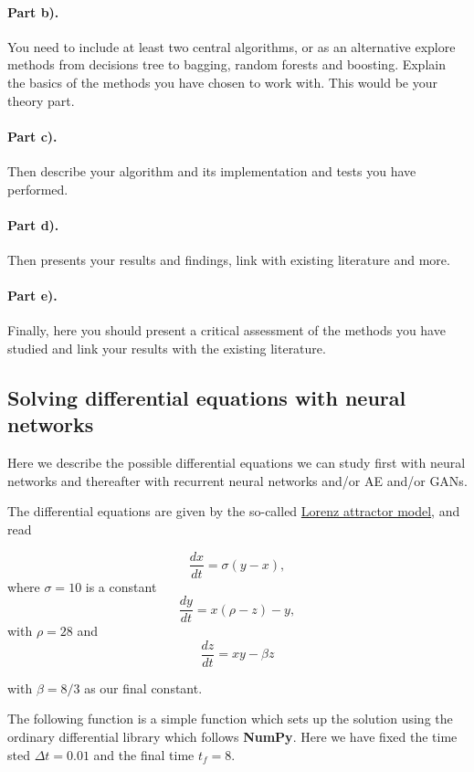 \documentclass[%
oneside,                 %
final,                   %
10pt]{article}
\begin{document}
\paragraph{Part b).}
You need to include at least two central algorithms, or as an alternative explore methods from decisions tree to bagging, random forests and boosting. Explain the basics of the methods you have chosen to work with. This would be your theory part.

\paragraph{Part c).}
Then describe your algorithm and its implementation and tests you have performed.

\paragraph{Part d).}
Then presents your results and findings, link with existing literature and more.

\paragraph{Part e).}
Finally, here you should present a critical assessment of the methods you have studied and link your results with the existing literature. 

\subsection{Solving  differential equations with neural networks}

Here we describe the possible differential equations we can study
first with neural networks and thereafter with recurrent neural
networks and/or AE and/or GANs.

The differential equations are given by the so-called \href{{https://encyclopediaofmath.org/index.php?title=Lorenz_attractor}}{Lorenz attractor model}, and read

\[
\frac{dx}{dt}=\sigma\left(y-x\right),
\]
where $\sigma =10$ is a constant
\[
\frac{dy}{dt}= x\left(\rho-z\right)-y,
\]
with $\rho=28$ and
\[
\frac{dz}{dt}=xy-\beta z
\]

with $\beta=8/3$ as our final constant.

The following function is a
simple function which sets up the solution using the ordinary
differential library which follows \textbf{NumPy}. Here we have fixed the
time sted $\Delta t=0.01$ and the final time $t_f=8$.
\end{document}
